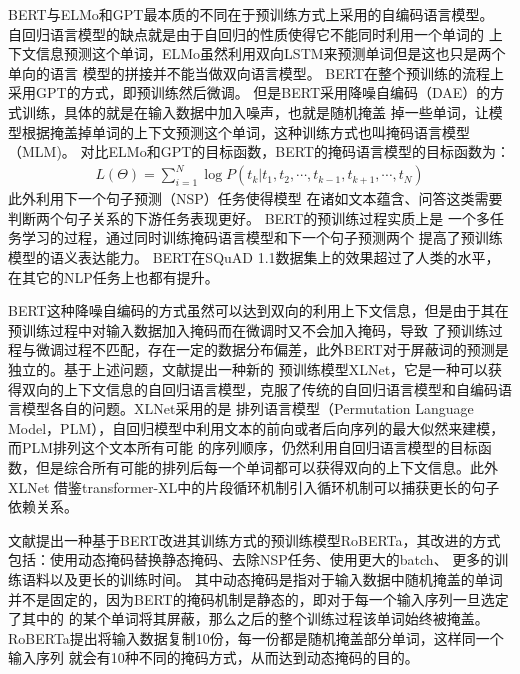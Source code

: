 BERT与ELMo和GPT最本质的不同在于预训练方式上采用的自编码语言模型。
自回归语言模型的缺点就是由于自回归的性质使得它不能同时利用一个单词的
上下文信息预测这个单词，ELMo虽然利用双向LSTM来预测单词但是这也只是两个单向的语言
模型的拼接并不能当做双向语言模型。
BERT在整个预训练的流程上采用GPT的方式，即预训练然后微调。
但是BERT采用降噪自编码（DAE）的方式训练，具体的就是在输入数据中加入噪声，也就是随机掩盖
掉一些单词，让模型根据掩盖掉单词的上下文预测这个单词，这种训练方式也叫掩码语言模型（MLM)。
对比ELMo和GPT的目标函数，BERT的掩码语言模型的目标函数为：
\begin{equation}
    \begin{split}
        L(\Theta)=\sum_{i=1}^{N}\log P(t_k|t_1,t_2,\cdots,t_{k-1},t_{k+1},\cdots,t_{N})
    \end{split}
\end{equation}
此外利用下一个句子预测（NSP）任务使得模型
在诸如文本蕴含、问答这类需要判断两个句子关系的下游任务表现更好。
BERT的预训练过程实质上是
一个多任务学习的过程，通过同时训练掩码语言模型和下一个句子预测两个
提高了预训练模型的语义表达能力。
BERT在SQuAD 1.1数据集上的效果超过了人类的水平，在其它的NLP任务上也都有提升。

BERT这种降噪自编码的方式虽然可以达到双向的利用上下文信息，但是由于其在预训练过程中对输入数据加入掩码而在微调时又不会加入掩码，导致
了预训练过程与微调过程不匹配，存在一定的数据分布偏差，此外BERT对于屏蔽词的预测是独立的。基于上述问题，文献\cite{XLNet}提出一种新的
预训练模型XLNet，它是一种可以获得双向的上下文信息的自回归语言模型，克服了传统的自回归语言模型和自编码语言模型各自的问题。XLNet采用的是
排列语言模型（Permutation Language Model，PLM），自回归模型中利用文本的前向或者后向序列的最大似然来建模，而PLM排列这个文本所有可能
的序列顺序，仍然利用自回归语言模型的目标函数，但是综合所有可能的排列后每一个单词都可以获得双向的上下文信息。此外XLNet
借鉴transformer-XL中的片段循环机制引入循环机制可以捕获更长的句子依赖关系。

文献\cite{RoBERTa}提出一种基于BERT改进其训练方式的预训练模型RoBERTa，其改进的方式包括：使用动态掩码替换静态掩码、去除NSP任务、使用更大的batch、
更多的训练语料以及更长的训练时间。
其中动态掩码是指对于输入数据中随机掩盖的单词并不是固定的，因为BERT的掩码机制是静态的，即对于每一个输入序列一旦选定了其中的
的某个单词将其屏蔽，那么之后的整个训练过程该单词始终被掩盖。RoBERTa提出将输入数据复制10份，每一份都是随机掩盖部分单词，这样同一个输入序列
就会有10种不同的掩码方式，从而达到动态掩码的目的。







